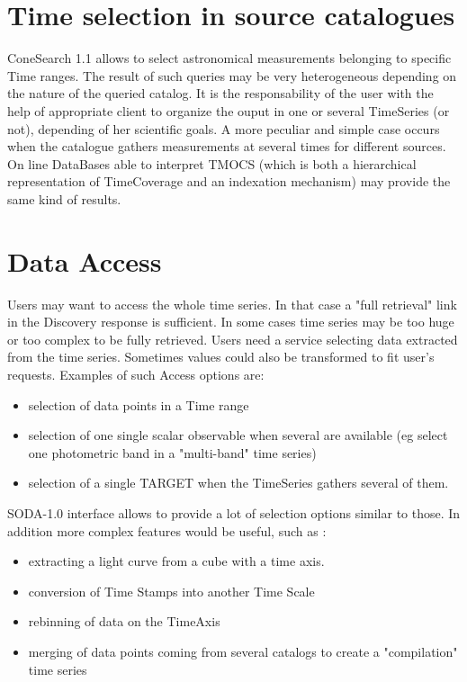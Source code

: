 \documentclass[11pt,a4paper]{ivoa}
\begin{document}
\section{Time selection in source catalogues}
\label{sec:conesearch}
ConeSearch 1.1 allows to select astronomical measurements belonging to specific Time ranges. The result of such queries may be very heterogeneous depending on the nature of the queried catalog. It is  the responsability of the user with the help of appropriate client to organize the ouput in one or several TimeSeries (or not), depending of her scientific goals. A more peculiar and simple case occurs when the catalogue gathers measurements at several times for  different sources.
On line DataBases able to interpret TMOCS (which is both a hierarchical representation of TimeCoverage and an indexation mechanism) may provide the same kind of results.    

\section{Data Access}
\label{sec:access}

      Users may want to access  the whole time series. In that case a "full retrieval" link in the Discovery response is sufficient. In some cases time series may be too huge or too complex to be fully retrieved. Users need a service selecting data extracted from  the time series. Sometimes values could also be transformed to fit user's requests.
Examples of such Access options are:

\begin{itemize}
     \item selection of data points in a Time range
     \item selection of one single scalar observable when several are available (eg select one photometric band in a "multi-band" time series)
     \item selection of a single TARGET  when the TimeSeries gathers several of them.
\end{itemize}
SODA-1.0 interface \citep{2017ivoa.spec.0517B}  allows to provide a lot of selection options similar to those. 
In addition more complex features would be useful, such as :
 \begin{itemize}
      \item extracting a light curve from a cube with a time axis.
      \item conversion of Time Stamps into another Time Scale
      \item rebinning of data on the TimeAxis
      \item merging of data points coming from several catalogs to create a "compilation" time series
\end{itemize}      
\end{document}
